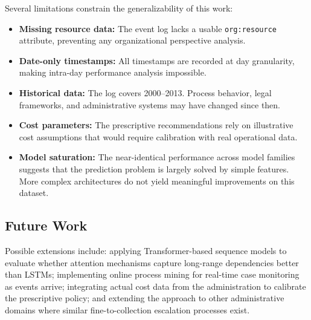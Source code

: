 Several limitations constrain the generalizability of this work:

\begin{itemize}
    \item \textbf{Missing resource data:} The event log lacks a usable \texttt{org:resource} attribute, preventing any organizational perspective analysis.
    \item \textbf{Date-only timestamps:} All timestamps are recorded at day granularity, making intra-day performance analysis impossible.
    \item \textbf{Historical data:} The log covers 2000–2013. Process behavior, legal frameworks, and administrative systems may have changed since then.
    \item \textbf{Cost parameters:} The prescriptive recommendations rely on illustrative cost assumptions that would require calibration with real operational data.
    \item \textbf{Model saturation:} The near-identical performance across model families suggests that the prediction problem is largely solved by simple features. More complex architectures do not yield meaningful improvements on this dataset.
\end{itemize}

\subsection{Future Work}
\label{sub:future_work}

Possible extensions include: applying Transformer-based sequence models to evaluate whether attention mechanisms capture long-range dependencies better than LSTMs; implementing online process mining for real-time case monitoring as events arrive; integrating actual cost data from the administration to calibrate the prescriptive policy; and extending the approach to other administrative domains where similar fine-to-collection escalation processes exist.